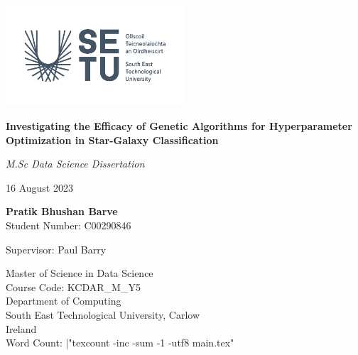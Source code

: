 \begin{titlepage}
   \begin{center}

    \includegraphics[width=0.5\textwidth]{images/RGB.png}
       \vfill

       {\large\textbf{Investigating the Efficacy of Genetic Algorithms for Hyperparameter Optimization in Star-Galaxy Classification}}
        
       \vfill

        \textit{M.Sc Data Science Dissertation}
            
       \vfill

       16 August 2023\\

       \vfill
       
       \textbf{Pratik Bhushan Barve}\\
       Student Number: C00290846\\

       \vfill
            
       Supervisor: Paul Barry

       \vfill
       
       Master of Science in Data Science\\
       Course Code: KCDAR\_M\_Y5\\
       Department of Computing\\
       South East Technological University, Carlow\\
       Ireland\\
       \vfill
       Word Count: \makeatletter\@@input|"texcount -inc -sum -1 -utf8 main.tex"\makeatother
            
   \end{center}
\end{titlepage}

